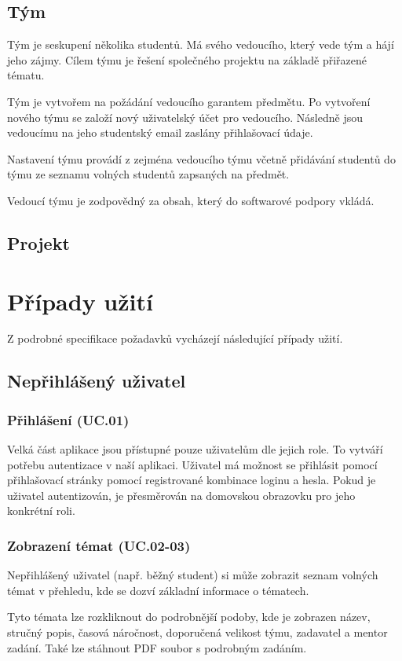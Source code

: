 \documentclass[czech,BP]{thesiskiv}
\begin{document}
		\subsection{Tým}
		\par Tým je seskupení několika studentů. Má svého vedoucího, který vede tým a hájí jeho zájmy. Cílem týmu je řešení společného projektu na základě přiřazené tématu.
		\par Tým je vytvořem na požádání vedoucího garantem předmětu. Po vytvoření nového týmu se založí nový uživatelský účet pro vedoucího. Následně jsou vedoucímu na jeho studentský email zaslány přihlašovací údaje.
		\par Nastavení týmu provádí z zejména vedoucího týmu včetně přidávání studentů do týmu ze seznamu volných studentů zapsaných na předmět.
		\par Vedoucí týmu je zodpovědný za obsah, který do softwarové podpory vkládá.
		\subsection{Projekt}
	\section{Případy užití}
		\par Z podrobné specifikace požadavků vycházejí následující případy užití.
		\subsection{Nepřihlášený uživatel}
			\subsubsection{Přihlášení (UC.01)}
				\par Velká část aplikace jsou přístupné pouze uživatelům dle jejich role. To vytváří potřebu autentizace v naší aplikaci. Uživatel má možnost se přihlásit pomocí přihlašovací stránky pomocí registrované kombinace loginu a hesla. Pokud je uživatel autentizován, je přesměrován na domovskou obrazovku pro jeho konkrétní roli.
			\subsubsection{Zobrazení témat (UC.02-03)}
				\par Nepřihlášený uživatel (např. běžný student) si může zobrazit seznam volných témat v přehledu, kde se dozví základní informace o tématech.
				\par Tyto témata lze rozkliknout do podrobnější podoby, kde je zobrazen název, stručný popis, časová náročnost, doporučená velikost týmu, zadavatel a mentor zadání. Také lze stáhnout PDF soubor s podrobným zadáním.
\end{document}
